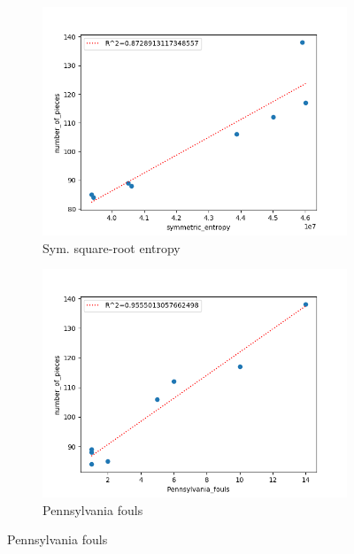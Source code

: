 \documentclass{mgggarticle}
\begin{document}
\begin{figure}
\begin{subfigure}{0.4\textwidth}
\centering
\includegraphics[width=\textwidth]{scatters/syment.png}
\caption{Sym. square-root entropy}
\end{subfigure}
\begin{subfigure}{0.4\textwidth}
\centering
\includegraphics[width=\textwidth]{scatters/Penn.png}
\caption{Pennsylvania fouls}
\end{subfigure}


\end{figure}
\end{document}

